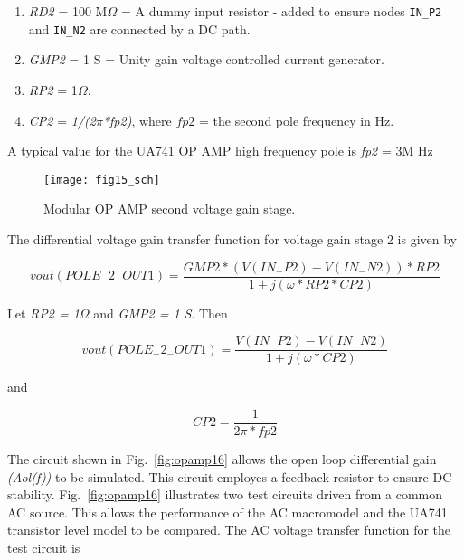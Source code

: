 \begin{enumerate}
\item\textit{RD2} = 100 M$\Omega$ = A dummy input resistor - added to ensure nodes \verb|IN_P2| and \verb|IN_N2| are connected by a DC path.
\item \textit{GMP2} = 1 S = Unity gain voltage controlled current generator.
\item \textit{RP2 } = 1$\Omega$.
\item \textit{CP2}  = \textit{1/(2$\pi$*fp2)}, where $fp2$ = the second pole frequency in Hz.
\end{enumerate}

A typical value for the UA741 OP AMP high frequency pole is  \textit{fp2}  =  3M Hz 


\begin{figure}
  \centering
  \texttt{[image: fig15\_sch]}
  \caption{Modular OP AMP second voltage gain stage.}
  \label{fig:opamp15}
\end{figure}

The differential voltage gain transfer function for voltage gain stage 2 is given by

\begin{equation}
vout(POLE_{-}2_{-}OUT1) = \dfrac{ GMP2 * ( V( IN _{-} P2 ) - V(IN _{-} N2) ) * RP2} { 1 + j (\omega * RP2 * CP2 ) }
\end{equation}

Let \textit{RP2 = 1$\Omega$} and \textit{GMP2 = 1 S}. Then 

\begin{equation}
vout(POLE_{-}2_{-}OUT1) = \dfrac{ V( IN _{-} P2 ) - V(IN _{-} N2)} { 1 + j (\omega *  CP2 ) }
\end{equation}

and

\begin{equation} 
CP2 = \dfrac{1} { 2\pi*fp2}
\end{equation}

\newpage
{}

The circuit shown in Fig.~\ref{fig:opamp16} allows the open loop differential gain \textit{(Aol(f))} to be simulated. This circuit employes a feedback resistor to ensure DC stability.  Fig.~\ref{fig:opamp16} illustrates two test circuits driven from a common AC source. This allows the performance of the AC macromodel and the UA741 transistor level model to be compared. The AC voltage transfer function for the test circuit is
  
